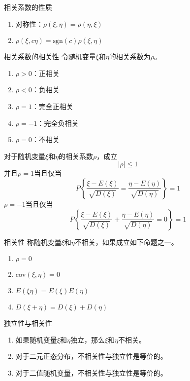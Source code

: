\documentclass[lang = cn, scheme = chinese, thmcnt = section]{elegantbook}
\begin{document}
\begin{proposition}{相关系数的性质}
	\begin{enumerate}
		\item 对称性：$\rho(\xi,\eta)=\rho(\eta,\xi)$
		\item $\rho(\xi,c\eta)=\mathrm{sgn}(c)\rho(\xi,\eta)$
	\end{enumerate}
\end{proposition}

\begin{proposition}{相关系数的相关性}
	令随机变量$\xi$和$\eta$的相关系数为$\rho$。
	\begin{enumerate}
		\item $\rho>0$：正相关
		\item $\rho<0$：负相关
		\item $\rho=1$：完全正相关
		\item $\rho=-1$：完全负相关
		\item $\rho=0$：不相关
	\end{enumerate}
\end{proposition}

\begin{proposition}
	对于随机变量$\xi$和$\eta$的相关系数$\rho$，成立%
	$$
	|\rho|\le 1
	$$
	并且$\rho=1$当且仅当
	$$
	P\left\{\frac{\xi-E(\xi)}{\sqrt{D(\xi)}}=\frac{\eta-E(\eta)}{\sqrt{D(\eta)}}\right\}=1
	$$
	$\rho=-1$当且仅当
	$$
	P\left\{\frac{\xi-E(\xi)}{\sqrt{D(\xi)}}+\frac{\eta-E(\eta)}{\sqrt{D(\eta)}}=0\right\}=1
	$$
\end{proposition}

\begin{definition}{相关性}
	称随机变量$\xi$和$\eta$不相关，如果成立如下命题之一。
	\begin{enumerate}
		\item $\rho=0$
		\item $\mathrm{cov}(\xi,\eta)=0$
		\item $E(\xi\eta)=E(\xi)E(\eta)$
		\item $D(\xi+\eta)=D(\xi)+D(\eta)$
	\end{enumerate}
\end{definition}

\begin{proposition}{独立性与相关性}
	\begin{enumerate}
		\item 如果随机变量$\xi$和$\eta$独立，那么$\xi$和$\eta$不相关。
		\item 对于二元正态分布，不相关性与独立性是等价的。
		\item 对于二值随机变量，不相关性与独立性是等价的。
	\end{enumerate}
\end{proposition}
\end{document}
